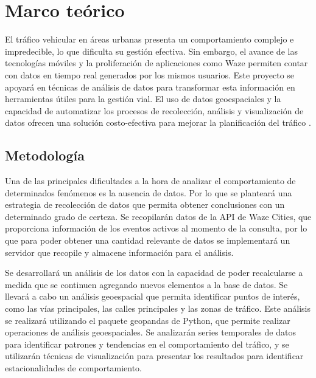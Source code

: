\documentclass[12pt]{article}
\begin{document}
\section{Marco teórico}

El tráfico vehicular en áreas urbanas presenta un comportamiento complejo e impredecible, lo que dificulta su gestión efectiva. Sin embargo, el avance de las tecnologías móviles y la proliferación de aplicaciones como Waze permiten contar con datos en tiempo real generados por los mismos usuarios. Este proyecto se apoyará en técnicas de análisis de datos para transformar esta información en herramientas útiles para la gestión vial. El uso de datos geoespaciales y la capacidad de automatizar los procesos de recolección, análisis y visualización de datos ofrecen una solución costo-efectiva para mejorar la planificación del tráfico \parencite{barcelo2005}.

\subsection{Metodología}

Una de las principales dificultades a la hora de analizar el comportamiento de determinados fenómenos es la ausencia de datos. Por lo que se planteará una estrategia de recolección de datos que permita obtener conclusiones con un determinado grado de certeza. Se recopilarán datos de la API de Waze Cities, que proporciona información de los eventos activos al momento de la consulta, por lo que para poder obtener una cantidad relevante de datos se implementará un servidor que recopile y almacene información para el análisis. 

Se desarrollará un análisis de los datos con la capacidad de poder recalcularse a medida que se continuen agregando nuevos elementos a la base de datos. Se llevará a cabo un análisis geoespacial que permita identificar puntos de interés, como las vías principales, las calles principales y las zonas de tráfico. Este análisis se realizará utilizando el paquete geopandas de Python, que permite realizar operaciones de análisis geoespaciales. Se analizarán series temporales de datos para identificar patrones y tendencias en el comportamiento del tráfico, y se utilizarán técnicas de visualización para presentar los resultados para identificar estacionalidades de comportamiento. 
\end{document}
